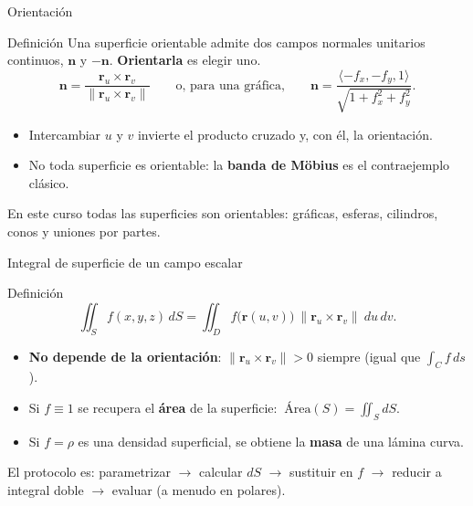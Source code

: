\documentclass[11pt,aspectratio=169]{beamer}
\begin{document}
\begin{frame}{Orientación}
  \begin{block}{Definición}
    Una superficie orientable admite dos campos normales unitarios continuos, $\mathbf n$ y $-\mathbf n$. \textbf{Orientarla} es elegir uno.
    \[
      \mathbf n = \frac{\mathbf r_u\times\mathbf r_v}{\|\mathbf r_u\times\mathbf r_v\|}
      \qquad\text{o, para una gráfica,}\qquad
      \mathbf n = \frac{\langle -f_x,-f_y,1\rangle}{\sqrt{1+f_x^2+f_y^2}}.
    \]
  \end{block}
  \pause
  \begin{itemize}
    \item Intercambiar $u$ y $v$ invierte el producto cruzado y, con él, la orientación.
    \pause
    \item No toda superficie es orientable: la \textbf{banda de Möbius} es el contraejemplo clásico.
  \end{itemize}
  \pause
  \begin{center}\small\color{gray60}
  En este curso todas las superficies son orientables: gráficas, esferas, cilindros, conos y uniones por partes.
  \end{center}
\end{frame}

\begin{frame}{Integral de superficie de un campo escalar}
  \begin{block}{Definición}
    \[
      \iint_S f(x,y,z)\,dS
      = \iint_D f\bigl(\mathbf r(u,v)\bigr)\ \|\mathbf r_u\times\mathbf r_v\|\ du\,dv.
    \]
  \end{block}
  \pause
  \begin{itemize}
    \item \textbf{No depende de la orientación}: $\|\mathbf r_u\times\mathbf r_v\|>0$ siempre (igual que $\int_C f\,ds$).
    \pause
    \item Si $f\equiv1$ se recupera el \textbf{área} de la superficie: $\ \text{Área}(S)=\iint_S dS$.
    \pause
    \item Si $f=\rho$ es una densidad superficial, se obtiene la \textbf{masa} de una lámina curva.
  \end{itemize}
  \vspace{6pt}
  \pause
  \begin{center}\small\color{gray60}
  El protocolo es: parametrizar $\to$ calcular $dS$ $\to$ sustituir en $f$ $\to$ reducir a integral doble $\to$ evaluar (a menudo en polares).
  \end{center}
\end{frame}
\end{document}

